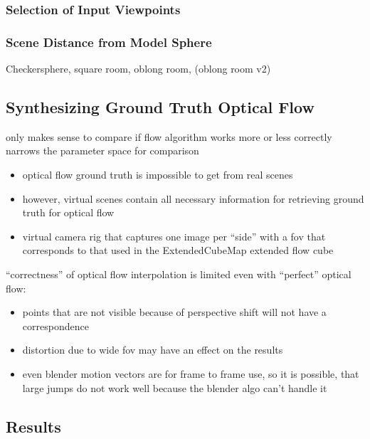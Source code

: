 \subsubsection{Selection of Input Viewpoints}

\subsubsection{Scene Distance from Model Sphere}
Checkersphere, square room, oblong room, (oblong room v2)

\subsection{Synthesizing Ground Truth Optical Flow}
 only makes sense to compare if flow algorithm works more or less correctly \ar narrows the parameter space for comparison
\begin{itemize}
  \item optical flow ground truth is impossible to get from real scenes
  \item however, virtual scenes contain all necessary information for retrieving ground truth for optical flow
  \item virtual camera rig that captures one image per ``side'' with a fov that corresponds to that used in the ExtendedCubeMap \ar extended flow cube
\end{itemize}

``correctness'' of optical flow interpolation is limited even with ``perfect'' optical flow:
\begin{itemize}
   \item points that are not visible because of perspective shift will not have a correspondence
   \item distortion due to wide fov may have an effect on the results
   \item even blender motion vectors are for frame to frame use, so it is possible, that large jumps do not work well because the blender algo can't handle it
\end{itemize}

\subsection{Results}
